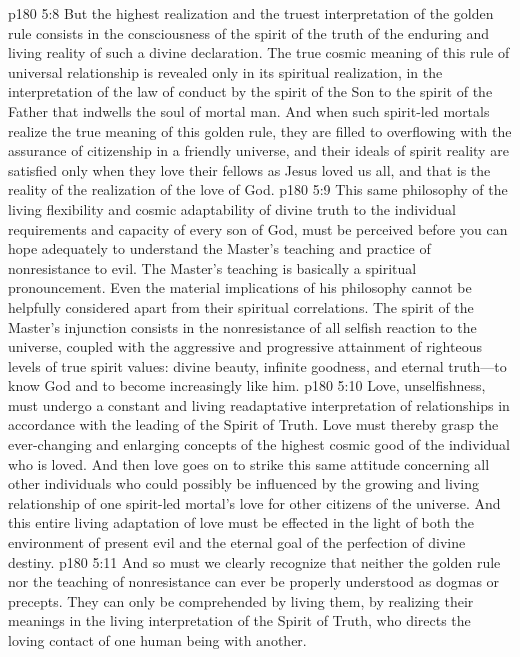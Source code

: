 \vs p180 5:8 But the highest realization and the truest interpretation of the golden rule consists in the consciousness of the spirit of the truth of the enduring and living reality of such a divine declaration. The true cosmic meaning of this rule of universal relationship is revealed only in its spiritual realization, in the interpretation of the law of conduct by the spirit of the Son to the spirit of the Father that indwells the soul of mortal man. And when such spirit\hyp{}led mortals realize the true meaning of this golden rule, they are filled to overflowing with the assurance of citizenship in a friendly universe, and their ideals of spirit reality are satisfied only when they love their fellows as Jesus loved us all, and that is the reality of the realization of the love of God.
\vs p180 5:9 This same philosophy of the living flexibility and cosmic adaptability of divine truth to the individual requirements and capacity of every son of God, must be perceived before you can hope adequately to understand the Master’s teaching and practice of nonresistance to evil. The Master’s teaching is basically a spiritual pronouncement. Even the material implications of his philosophy cannot be helpfully considered apart from their spiritual correlations. The spirit of the Master’s injunction consists in the nonresistance of all selfish reaction to the universe, coupled with the aggressive and progressive attainment of righteous levels of true spirit values: divine beauty, infinite goodness, and eternal truth---to know God and to become increasingly like him.
\vs p180 5:10 Love, unselfishness, must undergo a constant and living readaptative interpretation of relationships in accordance with the leading of the Spirit of Truth. Love must thereby grasp the ever\hyp{}changing and enlarging concepts of the highest cosmic good of the individual who is loved. And then love goes on to strike this same attitude concerning all other individuals who could possibly be influenced by the growing and living relationship of one spirit\hyp{}led mortal’s love for other citizens of the universe. And this entire living adaptation of love must be effected in the light of both the environment of present evil and the eternal goal of the perfection of divine destiny.
\vs p180 5:11 And so must we clearly recognize that neither the golden rule nor the teaching of nonresistance can ever be properly understood as dogmas or precepts. They can only be comprehended by living them, by realizing their meanings in the living interpretation of the Spirit of Truth, who directs the loving contact of one human being with another.
